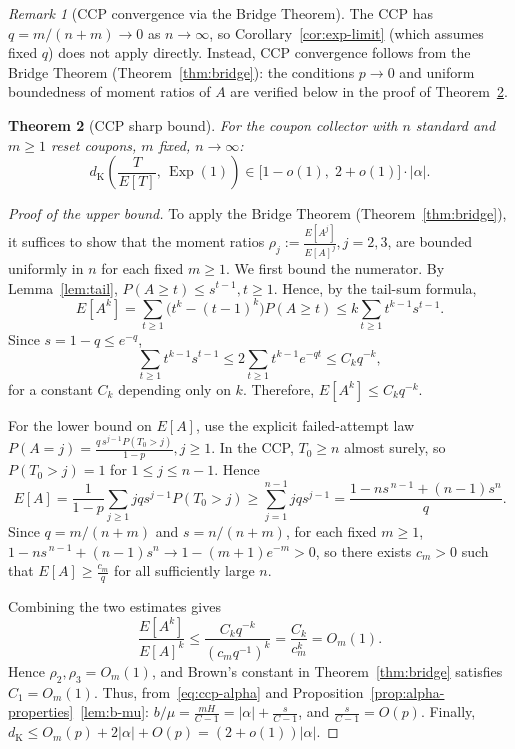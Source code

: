 \documentclass[11pt]{article}
\theoremstyle{plain}
\newtheorem{theorem}{Theorem}[section]
\theoremstyle{definition}
\theoremstyle{remark}
\newtheorem{remark}[theorem]{Remark}
\DeclareMathOperator{\Exp}{Exp}
\newcommand{\dK}{d_{\mathrm{K}}}
\begin{document}
\begin{remark}[CCP convergence via the Bridge Theorem]\label{rem:ccp-bridge}
The CCP has $q = m/(n+m) \to 0$ as $n \to \infty$, so Corollary~\ref{cor:exp-limit} (which assumes fixed $q$) does not apply directly.  Instead, CCP convergence follows from the Bridge Theorem (Theorem~\ref{thm:bridge}): the conditions $p \to 0$ and uniform boundedness of moment ratios of $A$ are verified below in the proof of Theorem~\ref{thm:ccp-sharp}.
\end{remark}

\begin{theorem}[CCP sharp bound]\label{thm:ccp-sharp}
For the coupon collector with $n$ standard and $m \geq 1$ reset coupons, $m$ fixed, $n \to \infty$:
\begin{equation}\label{eq:ccp-sharp}
  \dK\!\left(\frac{T}{E[T]},\, \Exp(1)\right) \in \bigl[1-o(1),\; 2+o(1)\bigr] \cdot |\alpha|.
\end{equation}
\end{theorem}

\begin{proof}[Proof of the upper bound]
To apply the Bridge Theorem (Theorem~\ref{thm:bridge}), it suffices to show
that the moment ratios
$\rho_j:=\frac{E[A^j]}{E[A]^j}, j=2,3$, are bounded uniformly in $n$ for each fixed $m\ge1$. We first bound the numerator. By Lemma~\ref{lem:tail},
$P(A\ge t)\le s^{t-1}, t\ge1$.
Hence, by the tail-sum formula,
\[
E[A^k]
=
\sum_{t\ge1}\bigl(t^k-(t-1)^k\bigr)P(A\ge t)
\le
k\sum_{t\ge1} t^{k-1}s^{t-1}.
\]
Since $s=1-q\le e^{-q}$,
\[
\sum_{t\ge1} t^{k-1}s^{t-1}
\le
2\sum_{t\ge1} t^{k-1}e^{-qt}
\le
C_k q^{-k},
\]
for a constant $C_k$ depending only on $k$. Therefore, $E[A^k]\le C_k q^{-k}$.


For the lower bound on $E[A]$, use the explicit failed-attempt law
$P(A=j)=\frac{q\,s^{j-1}P(T_0>j)}{1-p}, j\ge1$.
In the CCP, $T_0\ge n$ almost surely, so $P(T_0>j)=1$ for $1\le j\le n-1$.
Hence
\[
E[A]
=
\frac{1}{1-p}\sum_{j\ge1} j q s^{j-1}P(T_0>j)
\ge
\sum_{j=1}^{n-1} j q s^{j-1}
=
\frac{1-ns^{\,n-1}+(n-1)s^n}{q}.
\]
Since $q=m/(n+m)$ and $s=n/(n+m)$, for each fixed $m\ge1$,
$1-ns^{\,n-1}+(n-1)s^n \to 1-(m+1)e^{-m}>0$,
so there exists $c_m>0$ such that
$E[A]\ge \frac{c_m}{q}
$ for all sufficiently large $n$.



Combining the two estimates gives
\[
\frac{E[A^k]}{E[A]^k}
\le
\frac{C_k q^{-k}}{(c_m q^{-1})^k}
=
\frac{C_k}{c_m^k}
=
O_m(1).
\]
Hence $\rho_2,\rho_3=O_m(1)$, and Brown's constant in
Theorem~\ref{thm:bridge} satisfies $C_1=O_m(1)$. Thus, from~\eqref{eq:ccp-alpha} and Proposition~\ref{prop:alpha-properties}~\eqref{lem:b-mu}: $b/\mu = \frac{mH}{C-1} = |\alpha| + \frac{s}{C-1}$, and $\frac{s}{C-1} = O(p)$. Finally, $\dK \leq O_m(p) + 2|\alpha| + O(p) = (2+o(1))|\alpha|$.
\end{proof}
\end{document}
